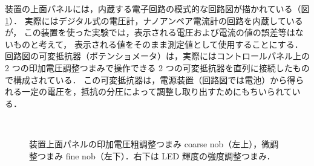 \documentclass[11pt,sort]{jarticle}
\begin{document}
装置の上面パネルには，内蔵する電子回路の模式的な回路図が描かれている（図\ref{fig:controlpanel}）．
実際にはデジタル式の電圧計，ナノアンペア電流計の回路を内蔵しているが，
この装置を使った実験では，表示される電圧および電流の値の誤差等はないものと考えて，
表示される値をそのまま測定値として使用することにする．
回路図の可変抵抗器（ポテンショメータ）は，実際にはコントロールパネル上の 2 つの印加電圧調整つまみで操作できる 2 つの可変抵抗器を直列に接続したもので構成されている．
この可変抵抗器は，電源装置（回路図では電池）から得られる一定の電圧を，抵抗の分圧によって調整し取り出すためにもちいられている．

\begin{figure}[t]
\begin{minipage}[t]{.5\textwidth}
\begin{center}
\\
\caption{装置上面パネルの印加電圧粗調整つまみ coarse nob（左上），微調整つまみ fine nob（左下）．右下は LED 輝度の強度調整つまみ．}\label{fig:controlpanel} 
\end{center}
\end{minipage}
\hfill
\begin{minipage}[t]{.45\textwidth}

\end{minipage}
\end{figure}
\end{document}
